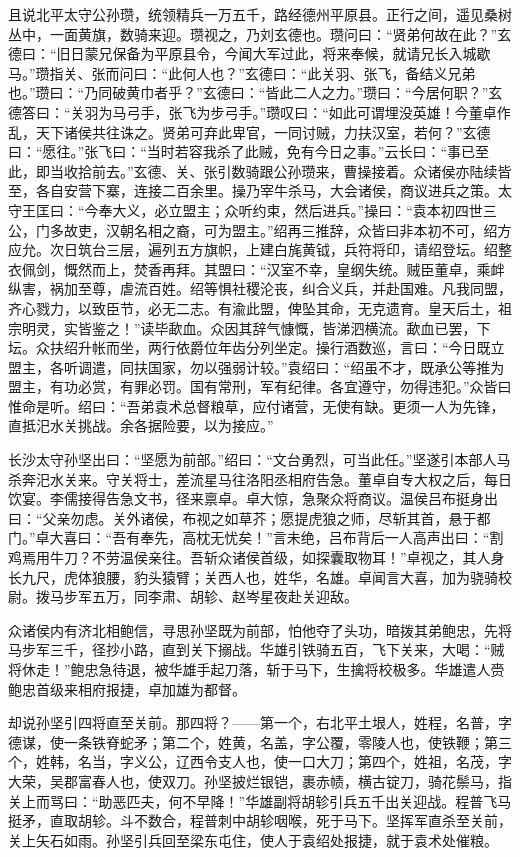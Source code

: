 且说北平太守公孙瓒，统领精兵一万五千，路经德州平原县。正行之间，遥见桑树丛中，一面黄旗，数骑来迎。瓒视之，乃刘玄德也。瓒问曰：“贤弟何故在此？”玄德曰：“旧日蒙兄保备为平原县令，今闻大军过此，将来奉候，就请兄长入城歇马。”瓒指关、张而问曰：“此何人也？”玄德曰：“此关羽、张飞，备结义兄弟也。”瓒曰：“乃同破黄巾者乎？”玄德曰：“皆此二人之力。”瓒曰：“今居何职？”玄德答曰：“关羽为马弓手，张飞为步弓手。”瓒叹曰：“如此可谓埋没英雄！今董卓作乱，天下诸侯共往诛之。贤弟可弃此卑官，一同讨贼，力扶汉室，若何？”玄德曰：“愿往。”张飞曰：“当时若容我杀了此贼，免有今日之事。”云长曰：“事已至此，即当收拾前去。”玄德、关、张引数骑跟公孙瓒来，曹操接着。众诸侯亦陆续皆至，各自安营下寨，连接二百余里。操乃宰牛杀马，大会诸侯，商议进兵之策。太守王匡曰：“今奉大义，必立盟主；众听约束，然后进兵。”操曰：“袁本初四世三公，门多故吏，汉朝名相之裔，可为盟主。”绍再三推辞，众皆曰非本初不可，绍方应允。次日筑台三层，遍列五方旗帜，上建白旄黄钺，兵符将印，请绍登坛。绍整衣佩剑，慨然而上，焚香再拜。其盟曰：“汉室不幸，皇纲失统。贼臣董卓，乘衅纵害，祸加至尊，虐流百姓。绍等惧社稷沦丧，纠合义兵，并赴国难。凡我同盟，齐心戮力，以致臣节，必无二志。有渝此盟，俾坠其命，无克遗育。皇天后土，祖宗明灵，实皆鉴之！”读毕歃血。众因其辞气慷慨，皆涕泗横流。歃血已罢，下坛。众扶绍升帐而坐，两行依爵位年齿分列坐定。操行酒数巡，言曰：“今日既立盟主，各听调遣，同扶国家，勿以强弱计较。”袁绍曰：“绍虽不才，既承公等推为盟主，有功必赏，有罪必罚。国有常刑，军有纪律。各宜遵守，勿得违犯。”众皆曰惟命是听。绍曰：“吾弟袁术总督粮草，应付诸营，无使有缺。更须一人为先锋，直抵汜水关挑战。余各据险要，以为接应。”

长沙太守孙坚出曰：“坚愿为前部。”绍曰：“文台勇烈，可当此任。”坚遂引本部人马杀奔汜水关来。守关将士，差流星马往洛阳丞相府告急。董卓自专大权之后，每日饮宴。李儒接得告急文书，径来禀卓。卓大惊，急聚众将商议。温侯吕布挺身出曰：“父亲勿虑。关外诸侯，布视之如草芥；愿提虎狼之师，尽斩其首，悬于都门。”卓大喜曰：“吾有奉先，高枕无忧矣！”言未绝，吕布背后一人高声出曰：“割鸡焉用牛刀？不劳温侯亲往。吾斩众诸侯首级，如探囊取物耳！”卓视之，其人身长九尺，虎体狼腰，豹头猿臂；关西人也，姓华，名雄。卓闻言大喜，加为骁骑校尉。拨马步军五万，同李肃、胡轸、赵岑星夜赴关迎敌。

众诸侯内有济北相鲍信，寻思孙坚既为前部，怕他夺了头功，暗拨其弟鲍忠，先将马步军三千，径抄小路，直到关下搦战。华雄引铁骑五百，飞下关来，大喝：“贼将休走！”鲍忠急待退，被华雄手起刀落，斩于马下，生擒将校极多。华雄遣人赍鲍忠首级来相府报捷，卓加雄为都督。

却说孙坚引四将直至关前。那四将？——第一个，右北平土垠人，姓程，名普，字德谋，使一条铁脊蛇矛；第二个，姓黄，名盖，字公覆，零陵人也，使铁鞭；第三个，姓韩，名当，字义公，辽西令支人也，使一口大刀；第四个，姓祖，名茂，字大荣，吴郡富春人也，使双刀。孙坚披烂银铠，裹赤帻，横古锭刀，骑花鬃马，指关上而骂曰：“助恶匹夫，何不早降！”华雄副将胡轸引兵五千出关迎战。程普飞马挺矛，直取胡轸。斗不数合，程普刺中胡轸咽喉，死于马下。坚挥军直杀至关前，关上矢石如雨。孙坚引兵回至梁东屯住，使人于袁绍处报捷，就于袁术处催粮。

